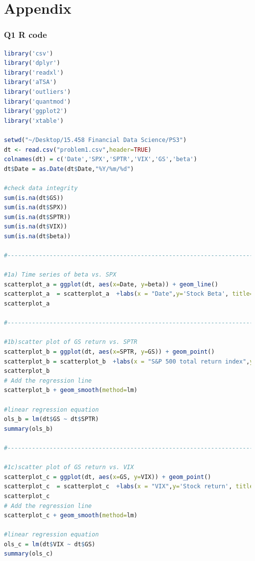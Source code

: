\documentclass[10pt]{article}
\begin{document}
\newpage
\section*{Appendix}
\subsubsection*{Q1 R code}
\begin{lstlisting}[language=R]
library('csv')
library('dplyr')
library('readxl')
library('aTSA')
library('outliers')
library('quantmod')
library('ggplot2')
library('xtable')

setwd("~/Desktop/15.458 Financial Data Science/PS3")
dt <- read.csv("problem1.csv",header=TRUE)
colnames(dt) = c('Date','SPX','SPTR','VIX','GS','beta')
dt$Date = as.Date(dt$Date,"%Y/%m/%d")

#check data integrity
sum(is.na(dt$GS))
sum(is.na(dt$SPX))
sum(is.na(dt$SPTR))
sum(is.na(dt$VIX))
sum(is.na(dt$beta))

#---------------------------------------------------------------------------------------#

#1a) Time series of beta vs. SPX
scatterplot_a = ggplot(dt, aes(x=Date, y=beta)) + geom_line()
scatterplot_a  = scatterplot_a  +labs(x = "Date",y='Stock Beta', title='Time Series plot of the GS beta')
scatterplot_a

#---------------------------------------------------------------------------------------#

#1b)scatter plot of GS return vs. SPTR
scatterplot_b = ggplot(dt, aes(x=SPTR, y=GS)) + geom_point()
scatterplot_b = scatterplot_b  +labs(x = "S&P 500 total return index",y='Stock return', title='Scatter plot of the GS return vs. SPTR')
scatterplot_b 
# Add the regression line
scatterplot_b + geom_smooth(method=lm)

#linear regression equation
ols_b = lm(dt$GS ~ dt$SPTR)
summary(ols_b)

#---------------------------------------------------------------------------------------#

#1c)scatter plot of GS return vs. VIX
scatterplot_c = ggplot(dt, aes(x=GS, y=VIX)) + geom_point()
scatterplot_c  = scatterplot_c  +labs(x = "VIX",y='Stock return', title='Scatter plot of the GS return vs. VIX')
scatterplot_c 
# Add the regression line
scatterplot_c + geom_smooth(method=lm)

#linear regression equation
ols_c = lm(dt$VIX ~ dt$GS)
summary(ols_c)


\end{lstlisting}
\end{document}
